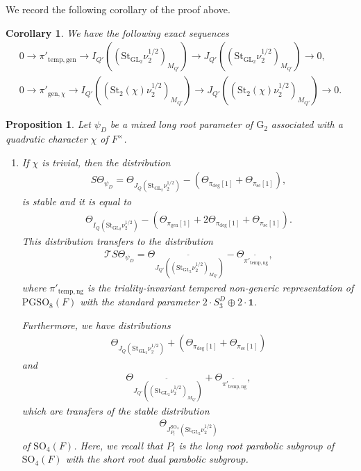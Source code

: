 \documentclass[12pt]{amsart}
\theoremstyle{definition}
\theoremstyle{plain}
\newtheorem{proposition}[definition]{Proposition}
\newtheorem{corollary}[definition]{Corollary}
\theoremstyle{remark}
\def\GL{\mathrm{GL}}
\def\SO{\mathrm{SO}}
\def\PGSO{\mathrm{PGSO}}
\newcommand{\cT}{\mathcal{T}}
\numberwithin{equation}{section}
\newcommand{\temp}{\mathrm{temp}}
\newcommand{\gen}{\mathrm{gen}}
\newcommand{\rG}{\mathrm{G}}
\newcommand{\St}{\mathrm{St}}
\begin{document}
We record the following corollary of the proof above.
\begin{corollary}
      We have the following exact sequences
      \begin{align*}
            0 \to \pi'_{\temp, \gen} \to I_{Q'}((\St_{\GL_2} \nu_2^{1/2})_{M_{Q'}}) \to J_{Q'}((\St_{\GL_2} \nu_2^{1/2})_{M_{Q'}}) \to 0, \\
            0 \to \pi'_{\mathrm{gen}, \chi} \to I_{Q'}((\St_{2}(\chi) \nu_2^{1/2})_{M_{Q'}}) \to J_{Q'}((\St_{2}(\chi) \nu_2^{1/2})_{M_{Q'}}) \to 0.
      \end{align*}
\end{corollary}

\begin{proposition}\label{prop:mixed-long-root-ecr}
      Let $\psi_D$ be a mixed long root parameter of ${\rG_2}$ associated with a quadratic character $\chi$ of $F^{\times}$.
      \begin{enumerate}
            \item 
            If $\chi$ is trivial, then the distribution
            \begin{align*}
                  S\Theta_{\psi_D} = \Theta_{J_Q(\St_{\GL_2} \nu_2^{1/2})} - (\Theta_{\pi_{\deg}[1]} + \Theta_{\pi_{\mathrm{sc}}[1]}),
            \end{align*}
            is stable and it is equal to
            \begin{align*}
                  \Theta_{I_Q(\St_{\GL_2} \nu_2^{1/2})} - (\Theta_{\pi_{\gen}[1]} + 2\Theta_{\pi_{\deg}[1]} + \Theta_{\pi_{\mathrm{sc}}[1]}).
            \end{align*}
            This distribution transfers to the distribution
            \begin{align*}
                  \cT S\Theta_{\psi_D} =
                  \Theta_{\widetilde{J_{Q'}((\St_{\GL_2} \nu_2^{1/2})_{M_{Q'}})}} - \Theta_{\widetilde{\pi'_{\temp, \mathrm{ng}}}},
            \end{align*}
            where $\pi'_{\temp, \mathrm{ng}}$ is the triality-invariant tempered non-generic representation of $\PGSO_8(F)$ with the standard parameter $2 \cdot S_3^D \oplus 2 \cdot \mathbf{1}$.

            Furthermore, we have distributions
            \begin{align*}
                  \Theta_{J_Q(\St_{\GL_2} \nu_2^{1/2})} + (\Theta_{\pi_{\deg}[1]} + \Theta_{\pi_{\mathrm{sc}}[1]})
            \end{align*}
            and 
            \begin{align*}
                  \Theta_{\widetilde{J_{Q'}((\St_{\GL_2} \nu_2^{1/2})_{M_{Q'}})}} + \Theta_{\widetilde{\pi'_{\temp, \mathrm{ng}}}},
            \end{align*}
            which are transfers of the stable distribution
            \begin{align*}
                  \Theta_{J_{P_{l}}^{\SO_4}(\St_{\GL_2} \nu_2^{1/2})}
            \end{align*}
            of $\SO_4(F)$.
            Here, we recall that $P_{l}$ is the long root parabolic subgroup of $\SO_4(F)$ with the short root dual parabolic subgroup.


\end{enumerate}
\end{proposition}
\end{document}
